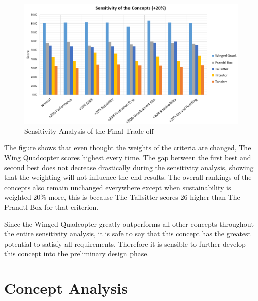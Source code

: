 \begin{figure}[htb]
    \centering
    \includegraphics[width=\textwidth]{ConceptTradeOff/Figures/sensitivity}
    \caption{Sensitivity Analysis of the Final Trade-off}
    \label{fig:sensitivityanal}
\end{figure}

The figure shows that even thought the weights of the criteria are changed, The Wing Quadcopter scores highest every time. The gap between the first best and second best does not decrease drastically during the sensitivity analysis, showing that the weighting will not influence the end results. The overall rankings of the concepts also remain unchanged everywhere except when sustainability is weighted 20\% more, this is because The Tailsitter scores 26 higher than The Prandtl Box for that criterion.

Since the Winged Quadcopter greatly outperforms all other concepts throughout the entire sensitivity analysis, it is safe to say that this concept has the greatest potential to satisfy all requirements. Therefore it is sensible to further develop this concept into the preliminary design phase.


\section{Concept Analysis}
\label{sec:conc_anal}


